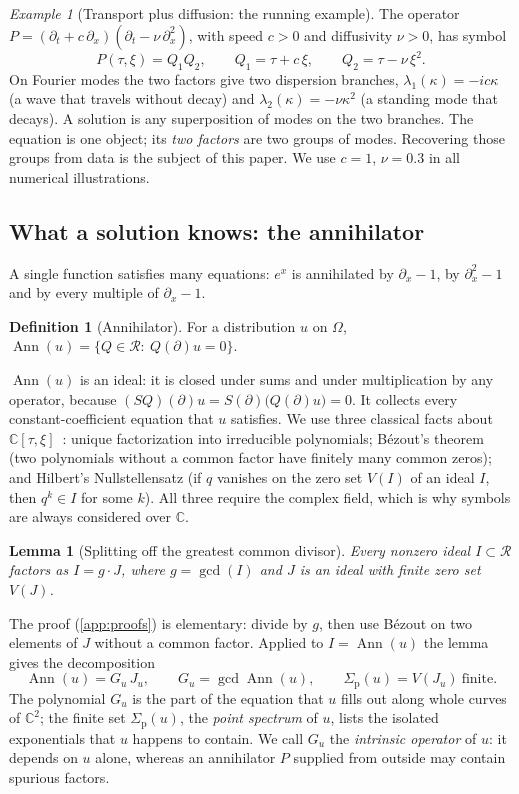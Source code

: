\documentclass[11pt]{article}
\theoremstyle{plain}
\newtheorem{lemma}[theorem]{Lemma}
\theoremstyle{definition}
\newtheorem{definition}[theorem]{Definition}
\theoremstyle{remark}
\newtheorem{example}[theorem]{Example}
\newcommand{\C}{\mathbb{C}}
\newcommand{\ring}{\mathcal{R}}            %
\DeclareMathOperator{\Ann}{Ann}             %
\DeclareMathOperator{\gcdop}{gcd}
\newcommand{\Var}{V}                        %
\newcommand{\Gu}{G_u}                       %
\newcommand{\Ju}{J_u}                       %
\newcommand{\sigp}{\Sigma_{\mathrm p}}      %
\begin{document}
\begin{example}[Transport plus diffusion: the running example]\label{ex:tpd}
The operator $P=(\partial_t+c\,\partial_x)(\partial_t-\nu\,\partial_x^2)$, with speed $c>0$ and diffusivity
$\nu>0$, has symbol
\[
  P(\tau,\xi)=Q_1Q_2,\qquad Q_1=\tau+c\,\xi,\qquad Q_2=\tau-\nu\,\xi^2 .
\]
On Fourier modes the two factors give two dispersion branches, $\lambda_1(\kappa)=-ic\kappa$ (a
wave that travels without decay) and $\lambda_2(\kappa)=-\nu\kappa^2$ (a standing mode that decays).
A solution is any superposition of modes on the two branches. The equation is one object; its
\emph{two factors} are two groups of modes. Recovering those groups from data is the subject of this
paper. We use $c=1$, $\nu=0.3$ in all numerical illustrations.
\end{example}

\subsection{What a solution knows: the annihilator}\label{sec:ann}
A single function satisfies many equations: $e^{x}$ is annihilated by $\partial_x-1$, by
$\partial_x^2-1$ and by every multiple of $\partial_x-1$.

\begin{definition}[Annihilator]\label{def:ann}
For a distribution $u$ on $\Omega$, $\Ann(u)=\{Q\in\ring:\ Q(\partial)u=0\}$.
\end{definition}

$\Ann(u)$ is an ideal: it is closed under sums and under multiplication by any operator, because
$(SQ)(\partial)u=S(\partial)\big(Q(\partial)u\big)=0$. It collects every constant-coefficient equation
that $u$ satisfies. We use three classical facts about $\C[\tau,\xi]$~\cite{CLO15}:
unique factorization into irreducible polynomials; B\'ezout's theorem (two polynomials without a
common factor have finitely many common zeros); and Hilbert's Nullstellensatz (if $q$ vanishes on
the zero set $\Var(I)$ of an ideal $I$, then $q^k\in I$ for some $k$). All three require the complex
field, which is why symbols are always considered over $\C$.

\begin{lemma}[Splitting off the greatest common divisor]\label{lem:gcd}
Every nonzero ideal $I\subset\ring$ factors as $I=g\cdot J$, where $g=\gcdop(I)$ and $J$ is an ideal
with finite zero set $\Var(J)$.
\end{lemma}

The proof (\cref{app:proofs}) is elementary: divide by $g$, then use B\'ezout on two elements of $J$
without a common factor. Applied to $I=\Ann(u)$ the lemma gives the decomposition
\begin{equation}\label{eq:GJ}
  \Ann(u)=\Gu\,\Ju,\qquad \Gu=\gcdop\Ann(u),\qquad \sigp(u)=\Var(\Ju)\ \text{finite}.
\end{equation}
The polynomial $\Gu$ is the part of the equation that $u$ fills out along whole curves of $\C^2$;
the finite set $\sigp(u)$, the \emph{point spectrum} of $u$, lists the isolated exponentials that $u$
happens to contain. We call $\Gu$ the \emph{intrinsic operator} of $u$: it depends on $u$ alone,
whereas an annihilator $P$ supplied from outside may contain spurious factors.
\end{document}
